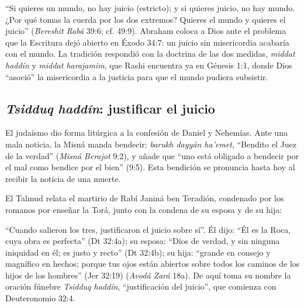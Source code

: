
``Si quieres un mundo, no hay juicio (estricto); y si quieres juicio, no hay mundo. ¿Por qué tomas la cuerda por los dos extremos? Quieres el mundo y quieres el juicio'' (\emph{Bereshit Rabá} 39:6; cf. 49:9). Abraham coloca a Dios ante el problema que la Escritura dejó abierto en Éxodo 34:7: un juicio sin misericordia acabaría con el mundo. La tradición respondió con la doctrina de las dos medidas, \emph{middat haddín} y \emph{middat harajamim}, que Rashi encuentra ya en Génesis 1:1, donde Dios ``asoció'' la misericordia a la justicia para que el mundo pudiera subsistir.


\subsection{\emph{Tsidduq haddín}: justificar el juicio}
El judaísmo dio forma litúrgica a la confesión de Daniel y Nehemías. Ante una mala noticia, la Misná manda bendecir:  \emph{barukh dayyán ha'emet}, ``Bendito el Juez de la verdad'' (\emph{Misná Berajot} 9:2), y añade que ``uno está obligado a bendecir por el mal como bendice por el bien'' (9:5). Esta bendición se pronuncia hasta hoy al recibir la noticia de una muerte.

El Talmud relata el martirio de Rabí Janiná ben Teradión, condenado por los romanos por enseñar la Torá, junto con la condena de su esposa y de su hija:


``Cuando salieron los tres, justificaron el juicio sobre sí''. Él dijo: ``Él es la Roca, cuya obra es perfecta'' (Dt 32:4a); su esposa: ``Dios de verdad, y sin ninguna iniquidad en él; es justo y recto'' (Dt 32:4b); su hija: ``grande en consejo y magnífico en hechos; porque tus ojos están abiertos sobre todos los caminos de los hijos de los hombres'' (Jer 32:19) (\emph{Avodá Zará} 18a). De aquí toma su nombre la oración fúnebre \emph{Tsidduq haddín}, ``justificación del juicio'', que comienza con Deuteronomio 32:4.


